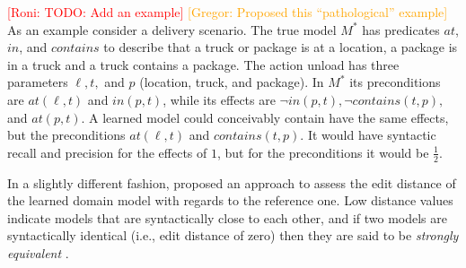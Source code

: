 \documentclass{article}
\theoremstyle{definition}
\theoremstyle{remark}
\newcommand{\realm}{\ensuremath{M^*}\xspace}
\newcommand{\roni}[1]{{\textcolor{red}{[Roni: #1]}}}
\newcommand{\mauro}[1]{{\textcolor{green}{[Mauro: #1]}}}
\newcommand{\gregor}[1]{{\textcolor{orange}{[Gregor: #1]}}}
\begin{document}
\roni{TODO: Add an example}
\gregor{Proposed this ``pathological'' example}
As an example consider a delivery scenario.
The true model $\realm$ has predicates $at$, $in$, and $contains$ to describe that a truck or package is at a location, a package is in a truck and a truck contains a package.
The action unload has three parameters $\ell, t,$ and $p$ (location, truck, and package).
In $\realm$ its preconditions are $at(\ell, t)$ and $in(p,t)$, while its effects are $\neg in(p,t), \neg contains(t,p),$ and $at(p,t)$.
A learned model could conceivably contain have the same effects, but the preconditions $at(\ell, t)$ and $contains(t,p)$.
It would have syntactic recall and precision for the effects of $1$, but for the preconditions it would be $\frac 1 2$.



In a slightly different fashion, \cite{chrpa2023comparing} proposed an approach to assess the edit distance of the learned domain model with regards to the reference one. Low distance values indicate models that are syntactically close to each other, and if two models are syntactically identical (i.e., edit distance of zero) then they are said to be \textit{strongly equivalent} \citep{chrpa2023comparing}.

\end{document}
